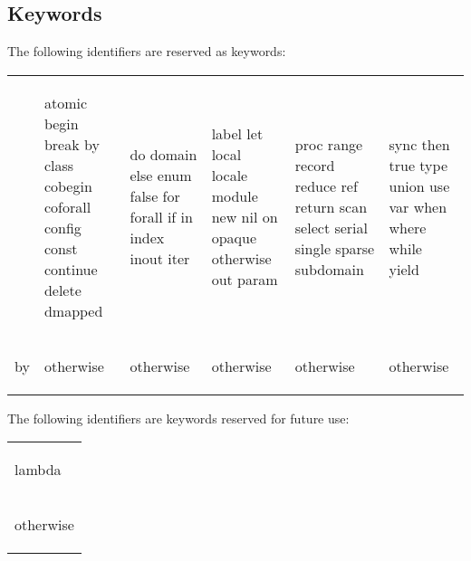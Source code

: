 \subsection{Keywords}
\label{Keywords}

The following identifiers are reserved as keywords:

\begin{tabular}{llllll}
&
\begin{chapel}
atomic
begin
break
by
class
cobegin
coforall
config
const
continue
delete
dmapped
\end{chapel} & \begin{chapel}
do
domain
else
enum
false
for
forall
if
in
index
inout
iter
\end{chapel} & \begin{chapel}
label
let
local
locale
module
new
nil
on
opaque
otherwise
out
param
\end{chapel} & \begin{chapel}
proc
range
record
reduce
ref
return
scan
select
serial
single
sparse
subdomain
\end{chapel} & \begin{chapel}
sync
then
true
type
union
use
var
when
where
while
yield
$$
\end{chapel} \\
\begin{invisible}
by
\end{invisible} & \begin{invisible}
otherwise
\end{invisible} & \begin{invisible}
otherwise
\end{invisible} & \begin{invisible}
otherwise
\end{invisible} & \begin{invisible}
otherwise
\end{invisible} & \begin{invisible}
otherwise
\end{invisible}
\end{tabular}

The following identifiers are keywords reserved for future use:

\begin{tabular}{l}
\begin{chapel}
lambda
\end{chapel} \\
\begin{invisible}
otherwise
\end{invisible}
\end{tabular}

